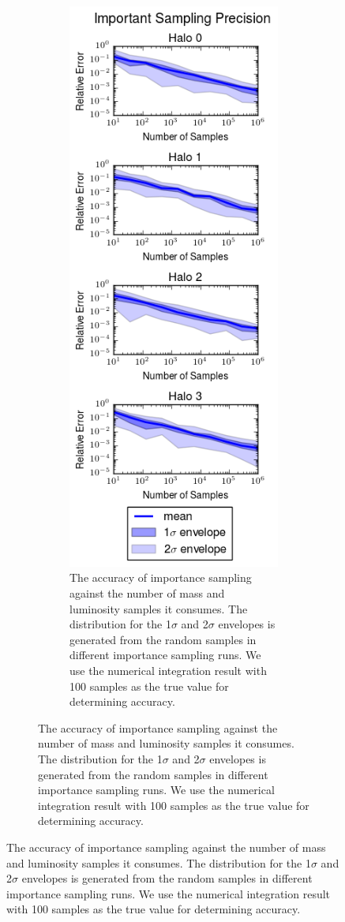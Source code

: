 \documentclass[\docopts]{\docclass}
\begin{document}
\begin{figure}[h!]
\begin{figure}[h!]
\begin{figure}[h]
\centering
\includegraphics[width=0.8\columnwidth]{is_precision.png}
\caption{
The accuracy of importance sampling against the number of mass and luminosity samples it consumes. The distribution for the 1$\sigma$ and 2$\sigma$ envelopes is generated from the random samples in different importance sampling runs. We use the numerical integration result with 100 samples as the true value for determining accuracy.
\label{fig:is_precision}}
\end{figure}


\end{figure}
\end{figure}
\end{document}
